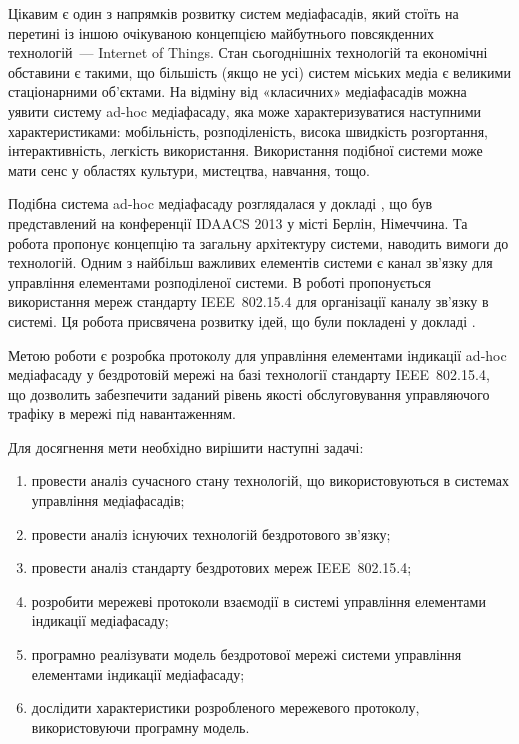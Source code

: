 \documentclass[a4paper,ukrainian,utf8,nocolumnsxix,nocolumnxxxii,nocolumnxxxi,floatsection,equationsection]{eskdtext}
\newcommand{\iee}[0]{IEEE~802.15.4\xspace}
\begin{document}
Цікавим є один з напрямків розвитку систем медіафасадів, який стоїть на перетині із іншою очікуваною концепцією майбутнього повсякденних технологій~--- Internet of Things. Стан сьогоднішніх технологій та економічні обставини є такими, що більшість (якщо не усі) систем міських медіа є великими стаціонарними об'єктами. На відміну від «класичних» медіафасадів можна уявити систему ad-hoc медіафасаду, яка може характеризуватися наступними характеристиками: мобільність, розподіленість, висока швидкість розгортання, інтерактивність, легкість використання. Використання подібної системи може мати сенс у областях культури, мистецтва, навчання, тощо.

Подібна система ad-hoc медіафасаду розглядалася у докладі \cite{idaacs:2013:adhoc:media:facade}, що був представлений на конференції IDAACS 2013 у місті Берлін, Німеччина. Та робота пропонує концепцію та загальну архітектуру системи, наводить вимоги до технологій. Одним з найбільш важливих елементів системи є канал зв'язку для управління елементами розподіленої системи. В роботі пропонується використання мереж стандарту \iee для організації каналу зв'язку в системі. Ця робота присвячена розвитку ідей, що були покладені у докладі \cite{idaacs:2013:adhoc:media:facade}.

Метою роботи є розробка протоколу для управління елементами індикації ad-hoc медіафасаду у бездротовій мережі на базі технології стандарту \iee, що дозволить забезпечити заданий рівень якості обслуговування управляючого трафіку в мережі під навантаженням.

Для досягнення мети необхідно вирішити наступні задачі:
\begin{enumerate}
	\item провести аналіз сучасного стану технологій, що використовуються в системах управління медіафасадів;
	\item провести аналіз існуючих технологій бездротового зв'язку;
	\item провести аналіз стандарту бездротових мереж \iee;
	\item розробити мережеві протоколи взаємодії в системі управління елементами індикації медіафасаду;
	\item\label{task:create_model} програмно реалізувати модель бездротової мережі системи управління елементами індикації медіафасаду;
	\item\label{task:do_simulation} дослідити характеристики розробленого мережевого протоколу, використовуючи програмну модель.
\end{enumerate}
\end{document}
